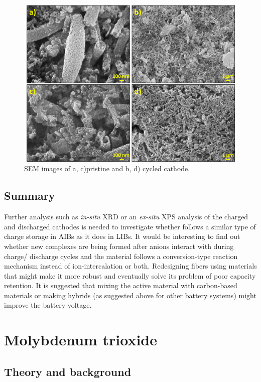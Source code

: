 \begin{figure}[th!]
\centering
\includegraphics[width=\textwidth]{Figures/chap6fig/SnO2SEM}
\caption{SEM images of a, c)pristine and b, d) cycled  cathode.}
\label{Figures/chap6fig:SnO2SEM}
\end{figure}
\subsection{Summary}
Further analysis such as \textit{in-situ} XRD or an \textit{ex-situ} XPS analysis of the charged and discharged cathodes is needed to investigate whether  follows a similar type of charge storage in AIBs as it does in LIBs. It would be interesting to find out whether new complexes are being formed after  anions interact with  during charge/ discharge cycles and the material follows a conversion-type reaction mechanism instead of ion-intercalation or both. Redesigning  fibers using materials that might make it more robust and eventually solve its problem of poor capacity retention. It is suggested that mixing the active material with carbon-based materials or making  hybrids (as suggested above for other battery systems) might improve the battery voltage. 


\section{Molybdenum trioxide}
\subsection{Theory and background}

